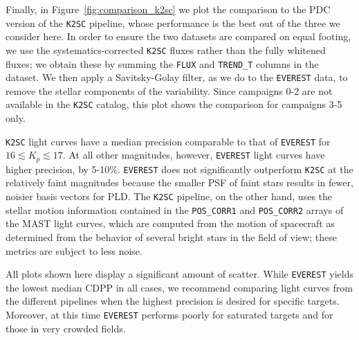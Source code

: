 \documentclass[]{emulateapj}
\begin{document}
Finally, in Figure~\ref{fig:comparison_k2sc} we plot the comparison to the PDC version
of the \texttt{K2SC}
pipeline, whose performance is the best out of the three we consider here. In order to 
ensure the two datasets are compared on equal footing, we use the systematics-corrected
\texttt{K2SC} fluxes rather than the fully whitened fluxes; we obtain these by
summing the \texttt{FLUX} and \texttt{TREND\_T} columns in the dataset. We then apply
a Savitsky-Golay filter, as we do to the \texttt{EVEREST} data, to remove the stellar 
components of the variability. Since campaigns 0-2 are not available in the \texttt{K2SC}
catalog, this plot shows the comparison for campaigns 3-5 only.

\texttt{K2SC} light curves have a median precision comparable to that of \texttt{EVEREST} for 
$16 \lesssim K_p \lesssim 17$. At all other magnitudes, however, \texttt{EVEREST}
light curves have higher precision, by 5-10\%.
\texttt{EVEREST} does not significantly outperform \texttt{K2SC} at the relatively faint
magnitudes because the smaller PSF of faint
stars results in fewer, noisier basis vectors for PLD. The \texttt{K2SC} pipeline, on 
the other hand, uses the stellar motion information contained in the \texttt{POS\_CORR1}
and \texttt{POS\_CORR2} arrays of the MAST light curves, which are computed from the
motion of spacecraft as determined from the behavior of several bright stars in the field
of view; these metrics are subject to less noise.

All plots shown here display a significant amount of scatter. While \texttt{EVEREST}
yields the lowest median CDPP in all cases, we recommend comparing light curves from
the different pipelines when the highest precision is desired for specific targets.
Moreover, at this time \texttt{EVEREST} performs poorly for saturated
targets and for those in very crowded fields.
\end{document}
